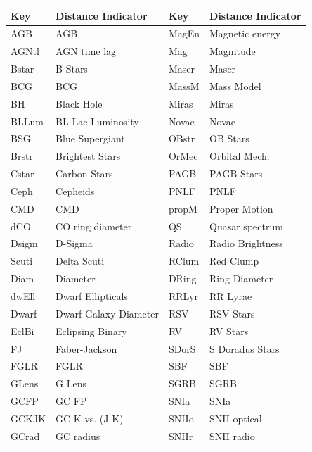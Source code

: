 \documentclass[iop]{emulateapj-rtx4}
\begin{document}
\begin{table}[ht]\footnotesize
\begin{center}
\begin{tabular}{l l | l l}
 \hline \hline
    Key       &	Distance Indicator		&	Key		&	Distance Indicator 	\\
  \hline \hline 
    AGB	&	AGB					&	MagEn    	&	Magnetic energy    	\\
    AGNtl	&	AGN time lag    		&	Mag    	&	Magnitude    	\\
    Bstar	&	B Stars				&	Maser    	&	Maser    	\\
    BCG	&	BCG					&	MassM    	&	Mass Model    	\\
    BH	&	Black Hole			&	Miras   	&	Miras    	\\
    BLLum	&	BL Lac Luminosity		&	Novae    	&	Novae    	\\
    BSG    	&	Blue Supergiant		&	OBstr    	&	OB Stars    	\\
    Brstr    	&	Brightest Stars    		&	OrMec    	&	Orbital Mech.    	\\
    Cstar    	&	Carbon Stars    			&	PAGB    	&	PAGB Stars    	\\
    Ceph    	&	Cepheids				&	PNLF    	&	PNLF    	\\
    CMD    	&	CMD					&	propM    	&	Proper Motion    	\\
    dCO    	&	CO ring diameter		&	QS    	&	Quasar spectrum    	\\
    Dsigm	&	D-Sigma				&	Radio    	&	Radio Brightness    	\\
    Scuti	&	Delta Scuti    			&	RClum    	&	Red Clump    	\\
    Diam	&	Diameter				&	DRing    	&	Ring Diameter    	\\
    dwEll	&	Dwarf Ellipticals    		&	RRLyr    	&	RR Lyrae    	\\
    Dwarf	&	Dwarf Galaxy Diameter	&	RSV    	&	RSV Stars    	\\
    EclBi	&	Eclipsing Binary		&	RV    	&	RV Stars    	\\
    FJ		&	Faber-Jackson			&	SDorS    	&	S Doradus Stars    	\\
    FGLR	&	FGLR				&	SBF    	&	SBF    	\\
    GLens	&	G Lens				&	SGRB    	&	SGRB    	\\
    GCFP	&	GC FP				&	SNIa    	&	SNIa    	\\
    GCKJK	&	GC K vs. (J-K)			&	SNIIo    	&	SNII optical    	\\
    GCrad	&	GC radius				&	SNIIr    	&	SNII radio    	\\

\end{tabular}
\end{center}
\end{table}
\end{document}
